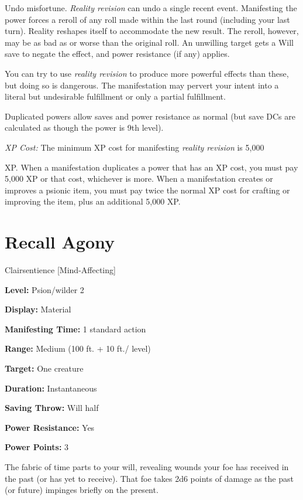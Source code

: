 \documentclass{article}
\begin{document}
\parindent=7pt
Undo misfortune. \textit{Reality revision }can undo a single recent event. Manifesting 
the power forces a reroll of any roll made within the last round (including your 
last turn). Reality reshapes itself to accommodate the new result. The reroll, 
however, may be as bad as or worse than the original roll. An unwilling target 
gets a Will save to negate the effect, and power resistance (if any) applies.

\parindent=0pt
You can try to use \textit{reality revision }to produce more powerful effects than 
these, but doing so is dangerous. The manifestation may pervert your intent into 
a literal but undesirable fulfillment or only a partial fulfillment.

Duplicated powers allow saves and power resistance as normal (but save DCs are 
calculated as though the power is 9th level).

\textit{XP Cost: }The minimum XP cost for manifesting \textit{reality revision 
}is 5,000

XP. When a manifestation duplicates a power that has an XP cost, you must pay 5,000 
XP or that cost, whichever is more. When a manifestation creates or improves a 
psionic item, you must pay twice the normal XP cost for crafting or improving the 
item, plus an additional 5,000 XP.

\vspace{12pt}
\section*{Recall Agony}

Clairsentience [Mind-Affecting]

\textbf{Level:} Psion/wilder 2

\textbf{Display:} Material

\textbf{Manifesting Time:} 1 standard action

\textbf{Range:} Medium (100 ft. + 10 ft./ level)

\textbf{Target:} One creature

\textbf{Duration:} Instantaneous

\textbf{Saving Throw:} Will half

\textbf{Power Resistance:} Yes

\textbf{Power Points:} 3

The fabric of time parts to your will, revealing wounds your foe has received in 
the past (or has yet to receive). That foe takes 2d6 points of damage as the past 
(or future) impinges briefly on the present.
\end{document}
